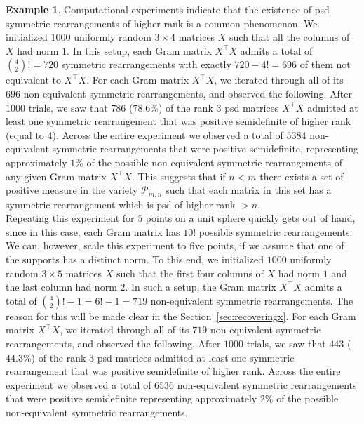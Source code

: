 \documentclass{article}
\theoremstyle{definition}
\newtheorem{Example}{Example}
\renewcommand{\|}{|}
\begin{document}
\begin{Example}
Computational experiments indicate that the existence of psd symmetric rearrangements of higher rank is a common phenomenon. We initialized $1000$ uniformly random $3\times 4$ matrices $X$ such that all the columns of $X$ had norm $1$. In this setup, each Gram matrix $X^\top X$ admits a total of $\binom{4}{2}! = 720$ symmetric rearrangements with exactly $720 - 4! = 696$ of them not equivalent to $X^\top X$. For each Gram matrix $X^\top X$, we iterated through all of its $696$ non-equivalent symmetric rearrangements, and observed the following. After $1000$ trials, we saw that $786$ ($78.6\%$) of the rank $3$ psd matrices $X^\top X$ admitted at least one symmetric rearrangement that was positive semidefinite of higher rank (equal to $4$). Across the entire experiment we observed a total of $5384$ non-equivalent symmetric rearrangements that were positive semidefinite, representing approximately $1\%$ of the possible non-equivalent symmetric rearrangements of any given Gram matrix $X^\top X$. This suggests that if $n < m$ there exists a set of positive measure in the variety $\mathcal{P}_{m,n}$ such that each matrix in this set has a symmetric rearrangement which is psd of higher rank $> n$. \\


Repeating this experiment for $5$ points on a unit sphere quickly gets out of hand, since in this case, each Gram matrix has $10!$ possible symmetric rearrangements. We can, however, scale this experiment to five points, if we assume that one of the supports has a distinct norm. To this end, we initialized $1000$ uniformly random $3 \times 5$ matrices $X$ such that the first four columns of $X$ had norm $1$ and the last column had norm $2$. In such a setup, the Gram matrix $X^\top X$ admits a total of $\binom{4}{2}! - 1 = 6! - 1 = 719$ non-equivalent symmetric rearrangements. The reason for this will be made clear in the Section~\ref{sec:recoveringx}. For each Gram matrix $X^\top X$, we iterated through all of its $719$ non-equivalent symmetric rearrangements, and observed the following. After $1000$ trials, we saw that $443$ ($44.3\%$) of the rank $3$ psd matrices admitted at least one symmetric rearrangement that was positive semidefinite of higher rank. Across the entire experiment we observed a total of $6536$ non-equivalent symmetric rearrangements that were positive semidefinite representing approximately $2\%$ of the possible non-equivalent symmetric rearrangements.
\end{Example}
\end{document}
